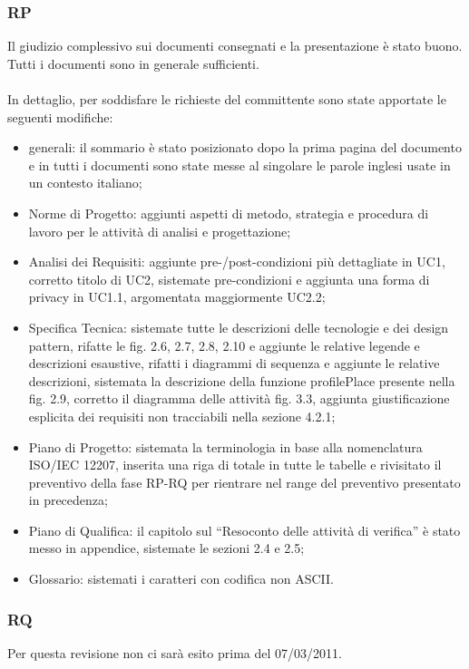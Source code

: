 \subsubsection*{RP}
Il giudizio complessivo sui documenti consegnati e la presentazione \`e stato
buono. Tutti i documenti sono in generale sufficienti.  \\ \\ In dettaglio, per
soddisfare le richieste del committente sono state apportate le seguenti modifiche:
\begin{itemize}
  \item generali: il sommario \`e stato posizionato dopo la prima pagina del
  documento e in tutti i documenti sono state messe al singolare le parole
  inglesi usate in un contesto italiano;
  \item Norme di Progetto: aggiunti aspetti di metodo, strategia e procedura di
  lavoro per le attivit\`a di analisi e progettazione;
  \item Analisi dei Requisiti: aggiunte pre-/post-condizioni pi\`u dettagliate
  in UC1, corretto titolo di UC2, sistemate pre-condizioni e aggiunta una forma
  di privacy in UC1.1, argomentata maggiormente UC2.2;
  \item Specifica Tecnica: sistemate tutte le descrizioni delle
  tecnologie e dei design pattern, rifatte le fig. 2.6, 2.7, 2.8, 2.10 e
  aggiunte le relative legende e descrizioni esaustive, rifatti i diagrammi di
  sequenza e aggiunte le relative descrizioni, sistemata la descrizione
  della funzione profilePlace presente nella fig. 2.9, corretto il diagramma
  delle attivit\`a fig. 3.3, aggiunta giustificazione esplicita dei requisiti
  non tracciabili nella sezione 4.2.1;
  \item Piano di Progetto: sistemata la terminologia in base alla nomenclatura
  ISO/IEC 12207, inserita una riga di totale in tutte le tabelle e rivisitato il
  preventivo della fase RP-RQ per rientrare nel range del preventivo presentato in precedenza;
  \item Piano di Qualifica: il capitolo sul ``Resoconto delle attivit\`a di
  verifica'' \`e stato messo in appendice, sistemate le sezioni 2.4 e 2.5;
  \item Glossario:  sistemati i caratteri con codifica non ASCII.
\end{itemize}

\subsubsection*{RQ}
Per questa revisione non ci sar\`a esito prima del 07/03/2011.


